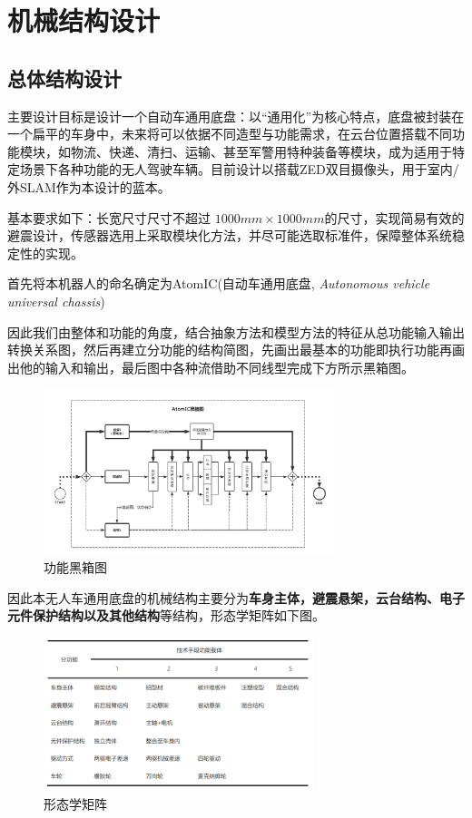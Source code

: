 \newpage

\section{机械结构设计}

\subsection{总体结构设计}

主要设计目标是设计一个自动车通用底盘：以“通用化”为核心特点，底盘被封装在一个扁平的车身中，未来将可以依据不同造型与功能需求，在云台位置搭载不同功能模块，如物流、快递、清扫、运输、甚至军警用特种装备等模块，成为适用于特定场景下各种功能的无人驾驶车辆。目前设计以搭载ZED双目摄像头，用于室内/外SLAM作为本设计的蓝本。

基本要求如下：长宽尺寸尺寸不超过 $ 1000mm \times 1000mm $的尺寸，实现简易有效的避震设计，传感器选用上采取模块化方法，并尽可能选取标准件，保障整体系统稳定性的实现。

首先将本机器人的命名确定为AtomIC(自动车通用底盘, \emph{Autonomous vehicle universal chassis})

因此我们由整体和功能的角度，结合抽象方法和模型方法的特征从总功能输入输出转换关系图，然后再建立分功能的结构简图，先画出最基本的功能即执行功能再画出他的输入和输出，最后图中各种流借助不同线型完成下方所示黑箱图。

\begin{figure}[htbp]
	\centering
	\includegraphics[width = 0.75\textwidth]{fig/hxt.png}
	\caption{功能黑箱图}
	\label{xtxjz}
\end{figure}

因此本无人车通用底盘的机械结构主要分为\textbf{车身主体，避震悬架，云台结构、电子元件保护结构以及其他结构}等结构，形态学矩阵如下图。

\begin{figure}[htbp]
	\centering
	\includegraphics[width = 0.7\textwidth]{fig/xtxjz.png}
	\caption{形态学矩阵}
	\label{xtxjz}
\end{figure}


